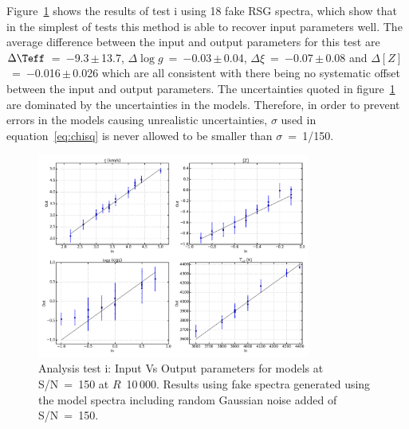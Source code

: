 Figure~\ref{fig:t1} shows the results of test i using 18 fake RSG spectra, which show that in the simplest of tests this method is able to recover input parameters well.
The average difference between the input and output parameters for this test are
$\Delta\Teff$~=~$-$9.3\,$\pm$\,13.7,
$\Delta\log g$~=~$-$0.03\,$\pm$\,0.04,
$\Delta\xi$~=~$-$0.07\,$\pm$\,0.08 and
$\Delta[Z]$~=~$-$0.016\,$\pm$\,0.026
which are all consistent with there being no systematic offset between the input and output parameters.
The uncertainties quoted in figure~\ref{fig:t1} are dominated by the uncertainties in the models.
Therefore, in order to prevent errors in the models causing unrealistic uncertainties,
$\sigma$ used in equation~\ref{eq:chisq} is never allowed to be smaller than $\sigma$~=~1/150.

\begin{figure}
 \centering
 \includegraphics[width=0.80\textwidth]{JAnal/Fakespec-t1-v2}
 \caption[Analysis test i: Input Vs Output parameters for models at S/N~=~150 at $R$~=~10\,000]{
 Analysis test i: Input Vs Output parameters for models at S/N~=~150 at $R$~10\,000. Results using fake spectra generated using the model spectra including random Gaussian noise added of S/N~=~150.
\label{fig:t1}
         }
\end{figure}



